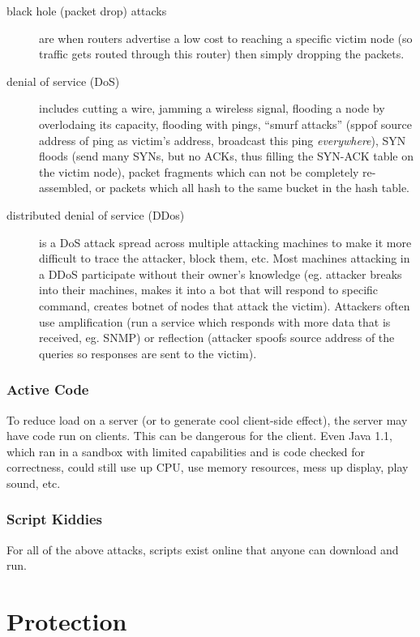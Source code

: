 \documentclass[12pt]{article}
\begin{document}
\begin{description}
\item[black hole (packet drop) attacks] are when routers advertise a low cost to reaching a specific victim node (so traffic gets routed through this router) then simply dropping the packets.
\item[denial of service (DoS)] includes cutting a wire, jamming a wireless signal, flooding a node by overlodaing its capacity, flooding with pings, ``smurf attacks'' (sppof source address of ping as victim's address, broadcast this ping \emph{everywhere}), SYN floods (send many SYNs, but no ACKs, thus filling the SYN-ACK table on the victim node), packet fragments which can not be completely re-assembled, or packets which all hash to the same bucket in the hash table.
\item[distributed denial of service (DDos)] is a DoS attack spread across multiple attacking machines to make it more difficult to trace the attacker, block them, etc. Most machines attacking in a DDoS participate without their owner's knowledge (eg. attacker breaks into their machines, makes it into a bot that will respond to specific command, creates botnet of nodes that attack the victim). Attackers often use amplification (run a service which responds with more data that is received, eg. SNMP) or reflection (attacker spoofs source address of the queries so responses are sent to the victim).
\end{description}

\subsubsection{Active Code}
To reduce load on a server (or to generate cool client-side effect), the server may have code run on clients. This can be dangerous for the client. Even Java 1.1, which ran in a sandbox with limited capabilities and is code checked for correctness, could still use up CPU, use memory resources, mess up display, play sound, etc.

\subsubsection{Script Kiddies}
For all of the above attacks, scripts exist online that anyone can download and run.

\section{Protection}
\end{document}
